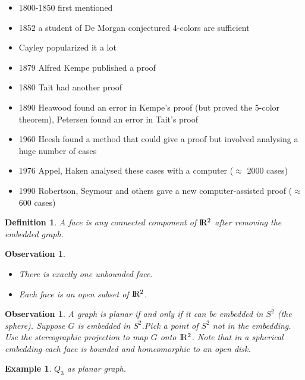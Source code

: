 \documentclass[a4paper]{article}
\theoremstyle{plain}
\newtheorem{definition}[lemma]{Definition}
\newtheorem{observation}[lemma]{Observation}
\theoremstyle{myremark}
\newtheorem{example}[lemma]{Example}
\begin{document}
\begin {itemize}
\item 1800-1850 first mentioned
\item 1852 a student of De Morgan conjectured 4-colors are sufficient
\item Cayley popularized it a lot
\item 1879 Alfred Kempe published a proof
\item 1880 Tait had another proof
\item 1890 Heawood found an error in Kempe's proof (but proved the 5-color theorem), 
                  Petersen found an error in Tait's proof
\item 1960 Heesh found a method that could give a proof but involved analysing a huge number of cases
\item 1976 Appel, Haken analysed these cases with a computer ($\approx$ 2000 cases)
\item 1990 Robertson, Seymour and others gave a new computer-assisted proof ($\approx$ 600 cases)
\end {itemize}
\bigskip
\begin {definition} A face is any connected component of ${\rm I\!R^2}$  after removing the embedded graph.
\end {definition}
\begin {observation}\begin{minipage}[t]{\linewidth}
\begin {itemize}
\item There is exactly one unbounded face.
\item Each face is an open subset of ${\rm I\!R^2}$.
\end {itemize}
\end {minipage}
\end {observation}
\begin {observation}
A graph is planar if and only if it can be embedded in ${S^2}$ (the sphere).
Suppose {$G$} is embedded in ${S^2}$.Pick a point of ${S^2}$ not in the embedding.
Use the stereographic projection to map {$G$} onto ${\rm I\!R^2}$.
Note that in a spherical embedding each face is bounded and homeomorphic to an open disk.
\end {observation}
\bigskip
\bigskip
\begin {example} {$Q_3$} as planar graph.
\end {example}
\end{document}
